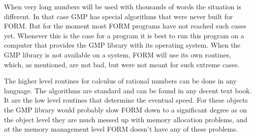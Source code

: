 When very long numbers will be used with thousands of words the situation 
is different. In that case GMP has special algorithms that were never built 
for FORM. But for the moment most FORM programs have not reached such cases 
yet. Whenever this is the case for a program it is best to run this program 
on a computer that provides the GMP library with its operating system. When 
the GMP library is not available on a system, FORM will use its own 
routines, which, as mentioned, are not bad, but were not meant for such 
extreme cases.

The higher level routines for calculus of rational numbers can be done in 
any language. The algorithms are standard and can be found in any decent 
text book. It are the low level routines that determine the eventual 
speed. For these objects the GMP library would probably slow FORM down to a 
significant degree as on the object level they are much messed up with 
memory allocation problems, and at the memory management level FORM doesn't 
have any of these problems.
